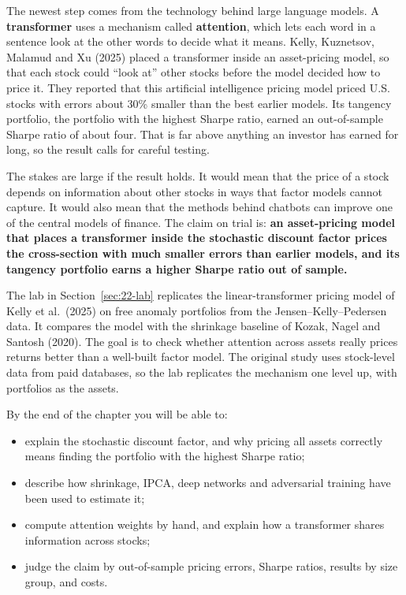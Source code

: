 The newest step comes from the technology behind large language models. A \textbf{transformer} uses a mechanism called \textbf{attention}, which lets each word in a sentence look at the other words to decide what it means. Kelly, Kuznetsov, Malamud and Xu (2025) placed a transformer inside an asset-pricing model, so that each stock could ``look at'' other stocks before the model decided how to price it. They reported that this artificial intelligence pricing model priced U.S. stocks with errors about 30\% smaller than the best earlier models. Its tangency portfolio, the portfolio with the highest Sharpe ratio, earned an out-of-sample Sharpe ratio of about four. That is far above anything an investor has earned for long, so the result calls for careful testing.

The stakes are large if the result holds. It would mean that the price of a stock depends on information about other stocks in ways that factor models cannot capture. It would also mean that the methods behind chatbots can improve one of the central models of finance. The claim on trial is: \textbf{an asset-pricing model that places a transformer inside the stochastic discount factor prices the cross-section with much smaller errors than earlier models, and its tangency portfolio earns a higher Sharpe ratio out of sample.}

The lab in Section~\ref{sec:22-lab} replicates the linear-transformer pricing model of Kelly et al.\ (2025) on free anomaly portfolios from the Jensen--Kelly--Pedersen data. It compares the model with the shrinkage baseline of Kozak, Nagel and Santosh (2020). The goal is to check whether attention across assets really prices returns better than a well-built factor model. The original study uses stock-level data from paid databases, so the lab replicates the mechanism one level up, with portfolios as the assets.

By the end of the chapter you will be able to:

\begin{itemize}
  \item explain the stochastic discount factor, and why pricing all assets correctly means finding the portfolio with the highest Sharpe ratio;
  \item describe how shrinkage, IPCA, deep networks and adversarial training have been used to estimate it;
  \item compute attention weights by hand, and explain how a transformer shares information across stocks;
  \item judge the claim by out-of-sample pricing errors, Sharpe ratios, results by size group, and costs.
\end{itemize}


